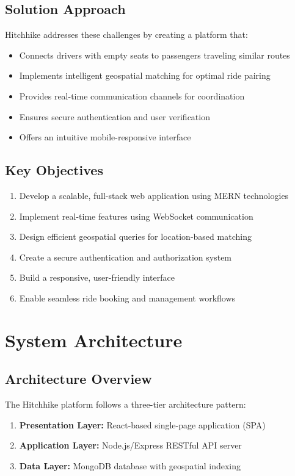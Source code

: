 \documentclass[12pt,a4paper]{article}
\begin{document}
\subsection{Solution Approach}
Hitchhike addresses these challenges by creating a platform that:
\begin{itemize}
    \item Connects drivers with empty seats to passengers traveling similar routes
    \item Implements intelligent geospatial matching for optimal ride pairing
    \item Provides real-time communication channels for coordination
    \item Ensures secure authentication and user verification
    \item Offers an intuitive mobile-responsive interface
\end{itemize}

\subsection{Key Objectives}
\begin{enumerate}
    \item Develop a scalable, full-stack web application using MERN technologies
    \item Implement real-time features using WebSocket communication
    \item Design efficient geospatial queries for location-based matching
    \item Create a secure authentication and authorization system
    \item Build a responsive, user-friendly interface
    \item Enable seamless ride booking and management workflows
\end{enumerate}

\newpage

\section{System Architecture}

\subsection{Architecture Overview}
The Hitchhike platform follows a three-tier architecture pattern:

\begin{enumerate}
    \item \textbf{Presentation Layer:} React-based single-page application (SPA)
    \item \textbf{Application Layer:} Node.js/Express RESTful API server
    \item \textbf{Data Layer:} MongoDB database with geospatial indexing
\end{enumerate}
\end{document}
